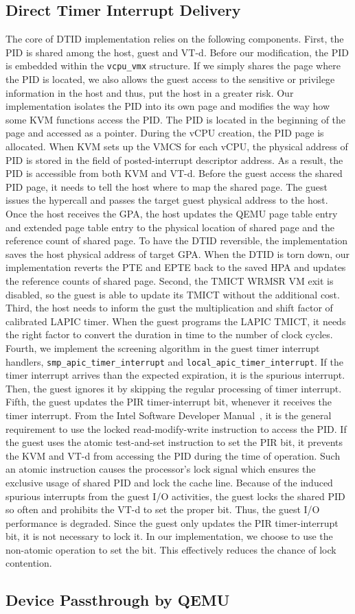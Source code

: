 \subsection{Direct Timer Interrupt Delivery}
The core of DTID implementation relies on the following
components. First, the PID is shared among the host, guest and
VT-d. Before our modification, the PID is embedded within the
\texttt{vcpu\_vmx} structure. If we simply shares the page
where the PID is located, we also allows the guest access to
the sensitive or privilege information in the host and thus,
put the host in a greater risk. Our implementation isolates
the PID into its own page and modifies the way how some KVM
functions access the PID. The PID is located in the beginning
of the page and accessed as a pointer. During the vCPU
creation, the PID page is allocated. When KVM sets up the VMCS
for each vCPU, the physical address of PID is stored in the
field of posted-interrupt descriptor address. As a result, the
PID is accessible from both KVM and VT-d. Before the guest
access the shared PID page, it needs to tell the host where to
map the shared page. The guest issues the hypercall and passes
the target guest physical address to the host. Once the host
receives the GPA, the host updates the QEMU page table entry
and extended page table entry to the physical location of
shared page and the reference count of shared page. To have
the DTID reversible, the implementation saves the host
physical address of target GPA. When the DTID is torn down,
our implementation reverts the PTE and EPTE back to the saved
HPA and updates the reference counts of shared page. Second,
the TMICT WRMSR VM exit is disabled, so the guest is able to
update its TMICT without the additional cost. Third, the host
needs to inform the gust the multiplication and shift factor
of calibrated LAPIC timer. When the guest programs the LAPIC
TMICT, it needs the right factor to convert the duration in
time to the number of clock cycles. Fourth, we implement the
screening algorithm in the guest timer interrupt handlers,
\texttt{smp\_apic\_timer\_interrupt} and
\texttt{local\_apic\_timer\_interrupt}. If the timer interrupt
arrives than the expected expiration, it is the spurious
interrupt. Then, the guest ignores it by skipping the regular
processing of timer interrupt. Fifth, the guest updates the
PIR timer-interrupt bit, whenever it receives the timer
interrupt. From the Intel Software Developer
Manual~\cite{sdm:2018}, it is the general requirement to use
the locked read-modify-write instruction to access the PID. If
the guest uses the atomic test-and-set instruction to set the
PIR bit, it prevents the KVM and VT-d from accessing the PID
during the time of operation. Such an atomic instruction
causes the processor's lock signal which ensures the exclusive
usage of shared PID and lock the cache line. Because of the
induced spurious interrupts from the guest I/O activities, the
guest locks the shared PID so often and prohibits the VT-d to
set the proper bit. Thus, the guest I/O performance is
degraded. Since the guest only updates the PIR timer-interrupt
bit, it is not necessary to lock it. In our implementation, we
choose to use the non-atomic operation to set the bit. This
effectively reduces the chance of lock contention.

\subsection{Device Passthrough by QEMU}

